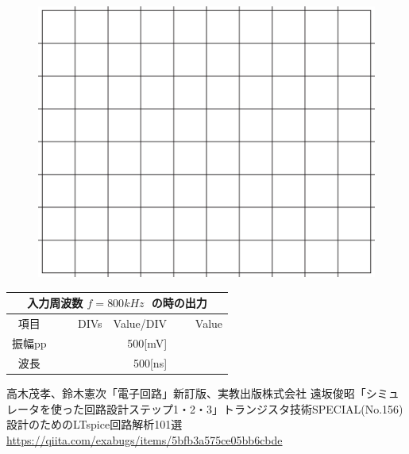 \documentclass[uplatex,a4paper,11pt,oneside,openany]{jsbook}
\begin{document}
\begin{multicols}{2}
  \begin{figure}[H]
     \centering
      \includegraphics[keepaspectratio, scale=0.28, angle=0]
                  {figs/eps/grid.eps}
                  \label{fig:grid50mV}
  \end{figure}

  \begin{spacing}{1.5}
  \begin{tabular}{|c||r|r|r|}
    \multicolumn{4}{c}{入力周波数 $f=800kHz\;$ の時の出力} \\ \hline
    項目 & DIVs & Value/DIV & Value \\ \hline \hline
    振幅pp & 　　　　 & 500[mV]& 　　　　 \\ \hline
    波長 & 　　　　 & 500[ns]& 　　　　 \\ \hline
  \end{tabular}
\end{spacing}
\end{multicols}

\vfill

\newpage
%
%
\appendix
%
\begin{thebibliography}{99}
 高木茂孝、鈴木憲次「電子回路」新訂版、実教出版株式会社
 遠坂俊昭「シミュレータを使った回路設計ステップ1・2・3」トランジスタ技術SPECIAL(No.156)設計のためのLTspice回路解析101選
 \url{https://qiita.com/exabugs/items/5bfb3a575ce05bb6cbde}
\end{thebibliography}
%
\end{document}
